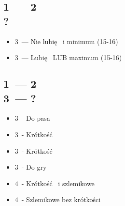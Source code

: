 \documentclass[12pt, a4paper]{article}
\begin{document}
    \subsection{1\ntx\ --- 2\nt\ \\ ?}
    \begin{itemize}
        \item 3\clubs\ --- Nie lubię \diams\ i minimum (15-16)
        \item 3\diams\ --- Lubię \diams\ LUB maximum (15-16)
    \end{itemize}
 
    \subsection{1\ntx\ --- 2\nt\ \\ 3\clubs\ --- ?}
    \begin{itemize}
        \item 3\diams\ - Do pasa
        \item 3\hearts\ - Krótkość \hearts 
        \item 3\spades\ - Krótkość \spades 
        \item 3\nt\ - Do gry \br
        \item 4\clubs\ - Krótkość \clubs\ i szlemikowe
        \item 4\diams\ - Szlemikowe bez krótkości
    \end{itemize}
\end{document}

